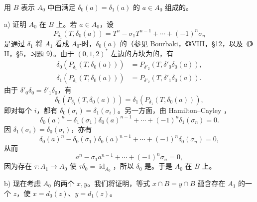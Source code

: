 用 $B$ 表示 $A_0$ 中由满足 $\delta_0(a)=\delta_1(a)$ 的 $a\in A_0$ 组成的。

a) 证明 $A_0$ 在 $B$ 上。若 $a\in A_0$，设
\[P_{\delta_1}(T,\delta_0(a))=T^n-\sigma_1T^{n-1}+\cdots+(-1)^n\sigma_n\]
是通过 $\delta_1$ 将 $A_1$ 看成 $A_0$-时，$\delta_0(a)$ 的（参见 Bourbaki，《》VIII，§12，以及《》II，§5，习题 9）。由于 $(0,1,2)^*$ 左边的方块为的，有
\[
\begin{aligned}
\delta_0(P_{\delta_1}(T,\delta_0(a)))&=P_{\delta'_2}(T,\delta'_0\delta_0(a)),\\
\delta_1(P_{\delta_1}(T,\delta_0(a)))&=P_{\delta'_2}(T,\delta'_1\delta_0(a)).
\end{aligned}
\]
由于 $\delta'_0\delta_0=\delta'_1\delta_0$，有
\[\delta_0(P_{\delta_1}(T,\delta_0(a)))=\delta_1(P_{\delta_1}(T,\delta_0(a))),\]
即对每个 $i$，都有 $\delta_0(\sigma_i)=\delta_1(\sigma_i)$。另一方面，由 Hamilton--Cayley ，
\[\delta_0(a)^n-\delta_1(\sigma_1)\delta_0(a)^{n-1}+\cdots+(-1)^n\delta_1(\sigma_n)=0.\]
因 $\delta_1(\sigma_i)=\delta_0(\sigma_i)$，亦有
\[\delta_0(a)^n-\delta_0(\sigma_1)\delta_0(a)^{n-1}+\cdots+(-1)^n\delta_0(\sigma_n)=0,\]
从而
\[a^n-\sigma_1a^{n-1}+\cdots+(-1)^n\sigma_n=0,\]
因为存在 $\tau:A_1\to A_0$ 使 $\tau\delta_0=\operatorname{id}_{A_0}$，所以 $\delta_0$ 是。于是 $A_0$ 在 $B$ 上。

b) 现在考虑 $A_0$ 的两个 $x,y$。我们将证明，等式 $x\cap B=y\cap B$ 蕴含存在 $A_1$ 的一个 $z$，使 $x=d_0(z)$、$y=d_1(z)$。

